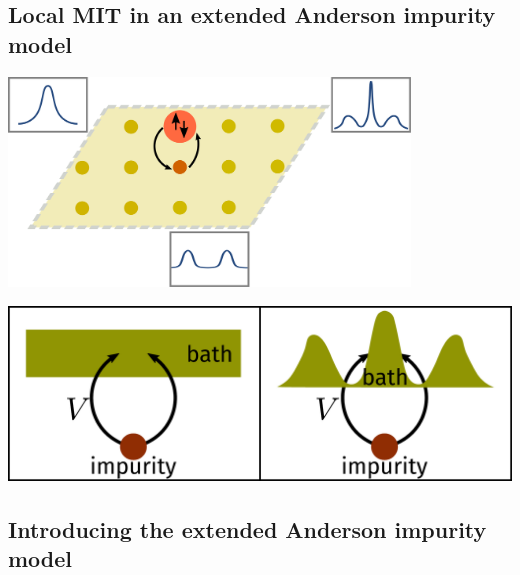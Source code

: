 \documentclass[8pt,aspectratio=169]{beamer}
\begin{document}
\begin{frame}{}
\section{Local MIT in an extended Anderson impurity model}

\begin{minipage}{0.5\textwidth}
\includegraphics[width=0.8\textwidth]{DMFT.pdf}
\end{minipage}
\hspace*{\fill}
\begin{minipage}{0.45\textwidth}
\includegraphics[width=\textwidth]{dos_diff.pdf}
\end{minipage}

\end{frame}

\begin{frame}{}
\section{Introducing the extended Anderson impurity model}
\end{frame}
\end{document}
